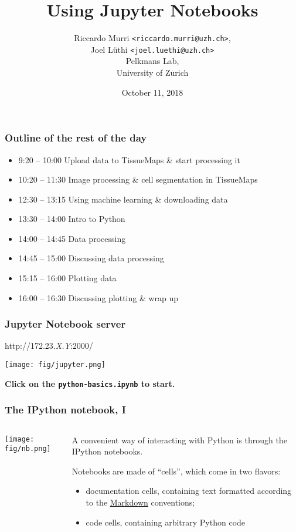 \documentclass[english,xcolor=pdftex,dvipsnames,table]{beamer}
\title[Introduction to Python]{%
  Using Jupyter Notebooks
}
\author[R.~Murri]{%
  Riccardo Murri \texttt{<riccardo.murri@uzh.ch>}, \\
  Joel Lüthi \texttt{<joel.luethi@uzh.ch>}
  \\
  Pelkmans Lab,
  \\
  University of Zurich
}
\date{October 11, 2018}
\begin{document}
\maketitle

\begin{frame}[fragile]
  \frametitle{Outline of the rest of the day}

  \begin{itemize}
    \color{gray}
  \item  9:20 -- 10:00	Upload data to TissueMaps \& start processing it
  \item 10:20 -- 11:30	Image processing \& cell segmentation in TissueMaps
  \item 12:30 -- 13:15	Using machine learning \& downloading data
    \color{black}
  \item 13:30 -- 14:00	Intro to Python
  \item 14:00 -- 14:45	Data processing
  \item 14:45 -- 15:00	Discussing data processing
  \item 15:15 -- 16:00	Plotting data
  \item 16:00 -- 16:30	Discussing plotting \& wrap up
  \end{itemize}
\end{frame}


\begin{frame}
  \frametitle{Jupyter Notebook server}
  \begin{center}
    {\huge\ttfamily http://172.23.{\em X.Y}:2000/}

    \+
    \texttt{[image: fig/jupyter.png]}

    \+\bf
    Click on the \texttt{python-basics.ipynb} to start.
\end{center}
\end{frame}


\begin{frame}
  \frametitle{The IPython notebook, I}

  \begin{columns}[t]
    \begin{column}{0.5\textwidth}
      \begin{center}
        \texttt{[image: fig/nb.png]}
      \end{center}
    \end{column}
    \begin{column}{0.5\textwidth}
      \small

      A convenient way of interacting with Python is through the IPython
      notebooks.

      \+
      Notebooks are made of ``cells'', which come in two flavors:
      \begin{itemize}
      \item documentation cells, containing text formatted according to the
        \href{http://commonmark.org/help/}{Markdown} conventions;
      \item code cells, containing arbitrary Python code
      \end{itemize}
    \end{column}
  \end{columns}
\end{frame}
\end{document}

